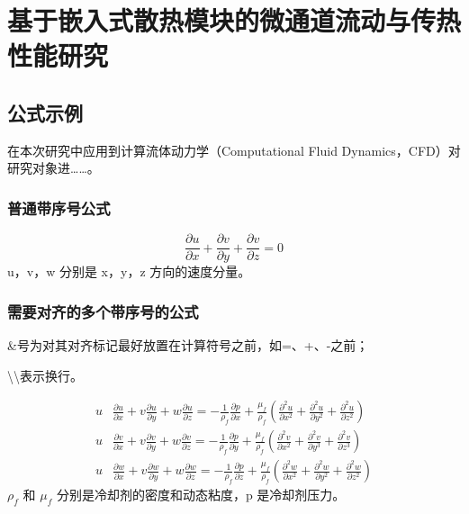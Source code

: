 
\chapter{基于嵌入式散热模块的微通道流动与传热性能研究}\label{ch:3}

\section{公式示例}
在本次研究中应用到计算流体动力学（Computational Fluid Dynamics，CFD）对研究对象进……。


\subsection{普通带序号公式}
\begin{equation}
    \frac{\partial u}{\partial x}+\frac{\partial v}{\partial y}+\frac{\partial v}{\partial z}=0
\end{equation}
u，v，w 分别是 x，y，z 方向的速度分量。


\subsection{需要对齐的多个带序号的公式}

\&号为对其对齐标记最好放置在计算符号之前，如=、+、-之前；

\textbackslash\textbackslash 表示换行。

\begin{align}%
    u & \frac{\partial u}{\partial x}+v \frac{\partial u}{\partial y}+w \frac{\partial u}{\partial z}=-\frac{1}{\rho_{f}} \frac{\partial p}{\partial x}+\frac{\mu_{f}}{\rho_{f}}\left(\frac{\partial^{2} u}{\partial x^{2}}+\frac{\partial^{2} u}{\partial y^{2}}+\frac{\partial^{2} u}{\partial z^{2}}\right) \\
    u & \frac{\partial v}{\partial x}+v \frac{\partial v}{\partial y}+w \frac{\partial v}{\partial z}=-\frac{1}{\rho_{f}} \frac{\partial p}{\partial y}+\frac{\mu_{f}}{\rho_{f}}\left(\frac{\partial^{2} v}{\partial x^{2}}+\frac{\partial^{2} v}{\partial y^{3}}+\frac{\partial^{2} v}{\partial z^{3}}\right) \\
    u & \frac{\partial w}{\partial x}+v \frac{\partial w}{\partial y}+w \frac{\partial w}{\partial z}=-\frac{1}{\rho_{f}} \frac{\partial p}{\partial z}+\frac{\mu_{f}}{\rho_{f}}\left(\frac{\partial^{2} w}{\partial x^{2}}+\frac{\partial^{2} w}{\partial y^{2}}+\frac{\partial^{2} w}{\partial z^{2}}\right)
\end{align}
$\rho_{f}$ 和 $\mu_{f}$ 分别是冷却剂的密度和动态粘度，p 是冷却剂压力。


